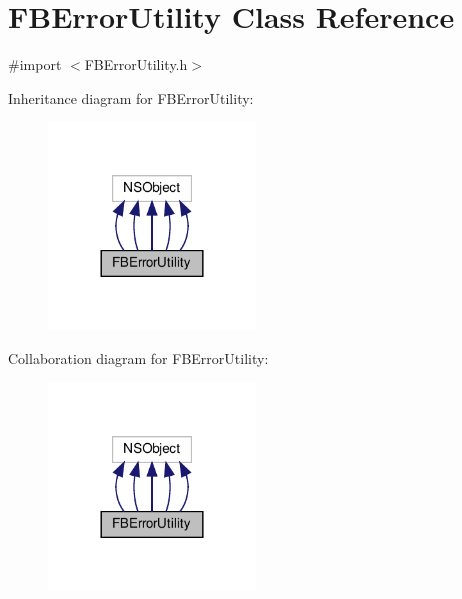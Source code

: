 \hypertarget{interfaceFBErrorUtility}{}\section{F\+B\+Error\+Utility Class Reference}
\label{interfaceFBErrorUtility}


{\ttfamily \#import $<$F\+B\+Error\+Utility.\+h$>$}



Inheritance diagram for F\+B\+Error\+Utility\+:
\nopagebreak
\begin{figure}[H]
\begin{center}
\leavevmode
\includegraphics[width=156pt]{interfaceFBErrorUtility__inherit__graph}
\end{center}
\end{figure}


Collaboration diagram for F\+B\+Error\+Utility\+:
\nopagebreak
\begin{figure}[H]
\begin{center}
\leavevmode
\includegraphics[width=156pt]{interfaceFBErrorUtility__coll__graph}
\end{center}
\end{figure}
